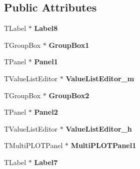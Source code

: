 \subsection*{Public Attributes}
\begin{DoxyCompactItemize}
\item 
\hypertarget{class_t_h_h2_current_form_a80ea7e8f53603b97cdd1b422f096bff3}{T\+Label $\ast$ {\bfseries Label8}}\label{class_t_h_h2_current_form_a80ea7e8f53603b97cdd1b422f096bff3}

\item 
\hypertarget{class_t_h_h2_current_form_abb3915d32903fabaf3370ac91cc561de}{T\+Group\+Box $\ast$ {\bfseries Group\+Box1}}\label{class_t_h_h2_current_form_abb3915d32903fabaf3370ac91cc561de}

\item 
\hypertarget{class_t_h_h2_current_form_a60e4a5d4efdc6e9204db53759f838453}{T\+Panel $\ast$ {\bfseries Panel1}}\label{class_t_h_h2_current_form_a60e4a5d4efdc6e9204db53759f838453}

\item 
\hypertarget{class_t_h_h2_current_form_ac140ffaf73754c043888c43be50ad57a}{T\+Value\+List\+Editor $\ast$ {\bfseries Value\+List\+Editor\+\_\+m}}\label{class_t_h_h2_current_form_ac140ffaf73754c043888c43be50ad57a}

\item 
\hypertarget{class_t_h_h2_current_form_a36293e5f63eb4af935ea686e9b44ab08}{T\+Group\+Box $\ast$ {\bfseries Group\+Box2}}\label{class_t_h_h2_current_form_a36293e5f63eb4af935ea686e9b44ab08}

\item 
\hypertarget{class_t_h_h2_current_form_a0c2aa9683a272b12d0b8cb016c7b5741}{T\+Panel $\ast$ {\bfseries Panel2}}\label{class_t_h_h2_current_form_a0c2aa9683a272b12d0b8cb016c7b5741}

\item 
\hypertarget{class_t_h_h2_current_form_a5ed3717979c2ce49f7934425962d33da}{T\+Value\+List\+Editor $\ast$ {\bfseries Value\+List\+Editor\+\_\+h}}\label{class_t_h_h2_current_form_a5ed3717979c2ce49f7934425962d33da}

\item 
\hypertarget{class_t_h_h2_current_form_a58d2c47b5fb30564ded9469f207627e2}{T\+Multi\+P\+L\+O\+T\+Panel $\ast$ {\bfseries Multi\+P\+L\+O\+T\+Panel1}}\label{class_t_h_h2_current_form_a58d2c47b5fb30564ded9469f207627e2}

\item 
\hypertarget{class_t_h_h2_current_form_a3d0494352a6ddc9cf471867af0c84ed1}{T\+Label $\ast$ {\bfseries Label7}}\label{class_t_h_h2_current_form_a3d0494352a6ddc9cf471867af0c84ed1}


\end{DoxyCompactItemize}
